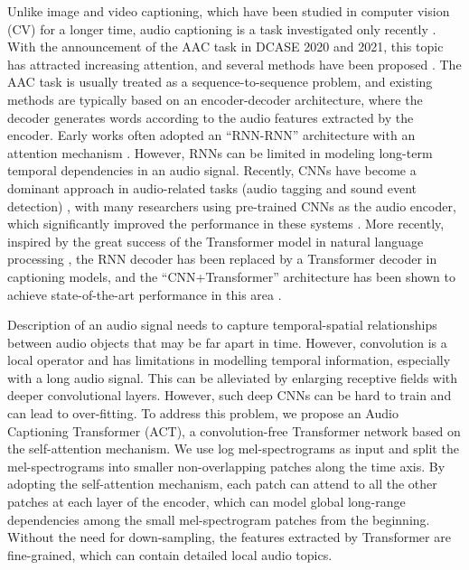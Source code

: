 \documentclass{article}
\begin{document}
\begin{sloppy}
Unlike image and video captioning, which have been studied in computer vision (CV) for a longer time, audio captioning is a task investigated only recently \cite{drossos2017automated}. With the announcement of the AAC task in DCASE 2020 and 2021, this topic has attracted increasing attention, and several methods have been proposed \cite{wu2019audio, kim2019audiocaps, ikawa2019neural}. The AAC task is usually treated as a sequence-to-sequence problem, and existing methods are typically based on an encoder-decoder architecture, where the decoder generates words according to the audio features extracted by the encoder. Early works often adopted an ``RNN-RNN'' architecture with an attention mechanism \cite{drossos2017automated, kim2019audiocaps}. However, RNNs can be limited in modeling long-term temporal dependencies in an audio signal. Recently, CNNs have become a dominant approach in audio-related tasks (audio tagging and sound event detection) \cite{kong2020panns}, with many researchers 
using pre-trained CNNs as the audio encoder,  which significantly improved the performance in these systems \cite{xu2021investigating}. More recently, inspired by the great success of the Transformer model in natural language processing \cite{vaswani2017attention}, the RNN decoder has been replaced by a Transformer decoder in captioning models, and the ``CNN+Transformer'' architecture has been shown to achieve state-of-the-art performance in this area \cite{chen2020audio, xinhao2021_t6}. 

Description of an audio signal needs to capture temporal-spatial relationships between audio objects that may be far apart in time. However, convolution is a local operator and has limitations in modelling temporal information, especially with a long audio signal. This can be alleviated by enlarging receptive fields with deeper convolutional layers. However, such deep CNNs can be hard to train and can lead to over-fitting. To address this problem, we propose an Audio Captioning Transformer (ACT), a convolution-free Transformer network based on the self-attention mechanism. We use log mel-spectrograms as input and split the mel-spectrograms into smaller non-overlapping patches along the time axis. By adopting the self-attention mechanism, each patch can attend to all the other patches at each layer of the encoder, which can model global long-range dependencies among the small mel-spectrogram patches from the beginning. Without the need for down-sampling, the features extracted by Transformer are fine-grained, which can contain detailed local audio topics. 


\end{sloppy}
\end{document}
